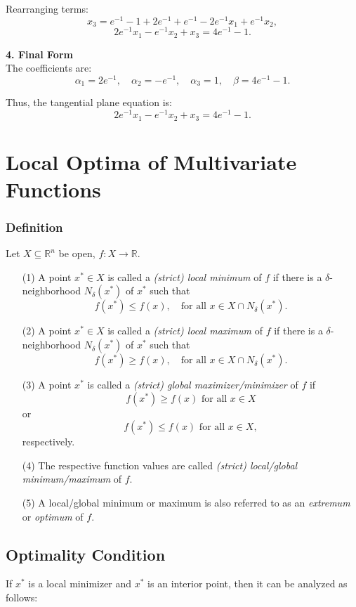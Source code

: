 \documentclass{article}
\begin{document}
Rearranging terms:
\[ x_{3} = e^{-1} - 1 + 2e^{-1} + e^{-1} - 2e^{-1}x_{1} + e^{-1}x_{2}, \]
\[ 2e^{-1}x_{1} - e^{-1}x_{2} + x_{3} = 4e^{-1} - 1. \]

\textbf{4. Final Form} \\
The coefficients are:
\[ \alpha_{1} = 2e^{-1}, \quad \alpha_{2} = -e^{-1}, \quad \alpha_{3} = 1, \quad \beta = 4e^{-1} - 1. \]

Thus, the tangential plane equation is:
\[ 2e^{-1}x_{1} - e^{-1}x_{2} + x_{3} = 4e^{-1} - 1. \]
\newpage
\section{Local Optima of Multivariate Functions}

\subsubsection*{Definition}
Let \( X \subseteq \mathbb{R}^n \) be open, \( f: X \to \mathbb{R} \).

\begin{enumerate}
    \item[(1)] A point \( x^* \in X \) is called a \textit{(strict) local minimum} of \( f \) if there is a \(\delta\)-neighborhood \( N_\delta(x^*) \) of \( x^* \) such that 
    \[ f(x^*) \leq f(x), \quad \text{for all } x \in X \cap N_\delta(x^*). \]

    \item[(2)] A point \( x^* \in X \) is called a \textit{(strict) local maximum} of \( f \) if there is a \(\delta\)-neighborhood \( N_\delta(x^*) \) of \( x^* \) such that
    \[ f(x^*) \geq f(x), \quad \text{for all } x \in X \cap N_\delta(x^*). \]

    \item[(3)] A point \( x^* \) is called a \textit{(strict) global maximizer/minimizer} of \( f \) if 
    \[ f(x^*) \geq f(x) \text{ for all } x \in X \]
    or
    \[ f(x^*) \leq f(x) \text{ for all } x \in X, \]
    respectively.

    \item[(4)] The respective function values are called \textit{(strict) local/global minimum/maximum} of \( f \).

    \item[(5)] A local/global minimum or maximum is also referred to as an \textit{extremum} or \textit{optimum} of \( f \).
\end{enumerate}

\subsection{Optimality Condition}
If \( x^* \) is a local minimizer and \( x^* \) is an interior point, then it can be analyzed as follows:
\end{document}
